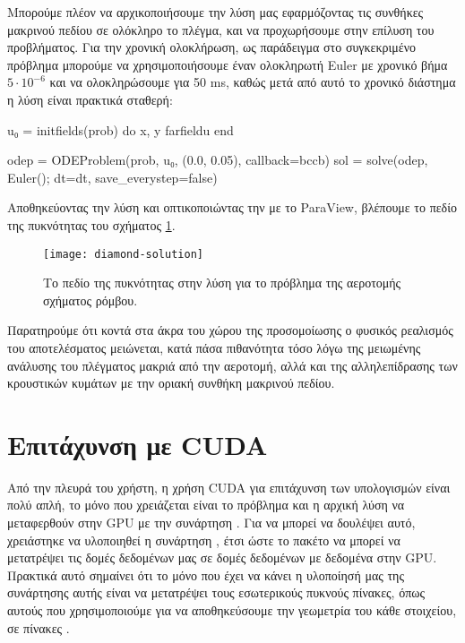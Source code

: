 Μπορούμε πλέον να αρχικοποιήσουμε την λύση μας εφαρμόζοντας τις συνθήκες μακρινού πεδίου σε ολόκληρο το πλέγμα, και να προχωρήσουμε στην επίλυση του προβλήματος. Για την χρονική ολοκλήρωση, ως παράδειγμα στο συγκεκριμένο πρόβλημα μπορούμε να χρησιμοποιήσουμε έναν ολοκληρωτή Euler με χρονικό βήμα $5 \cdot 10^{-6}$ και να ολοκληρώσουμε για 50 ms, καθώς μετά από αυτό το χρονικό διάστημα η λύση είναι πρακτικά σταθερή:

{\large
\begin{jllisting}[language=julia,style=jlcodestyle]
u₀ = initfields(prob) do x, y
	farfieldu
end

odep = ODEProblem(prob, u₀, (0.0, 0.05), callback=bccb)
sol = solve(odep, Euler(); dt=dt, save_everystep=false)
\end{jllisting}
}

Αποθηκεύοντας την λύση και οπτικοποιώντας την με το ParaView, βλέπουμε το πεδίο της πυκνότητας του σχήματος \ref{fig:diamond-solution}.

\begin{figure}[H]
    \centering
    \texttt{[image: diamond-solution]}
    \caption{Το πεδίο της πυκνότητας στην λύση για το πρόβλημα της αεροτομής σχήματος ρόμβου.}
    \label{fig:diamond-solution}
\end{figure}

Παρατηρούμε ότι κοντά στα άκρα του χώρου της προσομοίωσης ο φυσικός ρεαλισμός του αποτελέσματος μειώνεται, κατά πάσα πιθανότητα τόσο λόγω της μειωμένης ανάλυσης του πλέγματος μακριά από την αεροτομή, αλλά και της αλληλεπίδρασης των κρουστικών κυμάτων με την οριακή συνθήκη μακρινού πεδίου.

\section{Επιτάχυνση με CUDA}

Από την πλευρά του χρήστη, η χρήση CUDA για επιτάχυνση των υπολογισμών είναι πολύ απλή, το μόνο που χρειάζεται είναι το πρόβλημα και η αρχική λύση να μεταφερθούν στην GPU με την συνάρτηση .
Για να μπορεί να δουλέψει αυτό, χρειάστηκε να υλοποιηθεί η συνάρτηση , έτσι ώστε το πακέτο  να μπορεί να μετατρέψει τις δομές δεδομένων μας σε δομές δεδομένων με δεδομένα στην GPU.
Πρακτικά αυτό σημαίνει ότι το μόνο που έχει να κάνει η υλοποίησή μας της συνάρτησης αυτής είναι να μετατρέψει τους εσωτερικούς πυκνούς πίνακες, όπως αυτούς που χρησιμοποιούμε για να αποθηκεύσουμε την γεωμετρία του κάθε στοιχείου, σε πίνακες .

